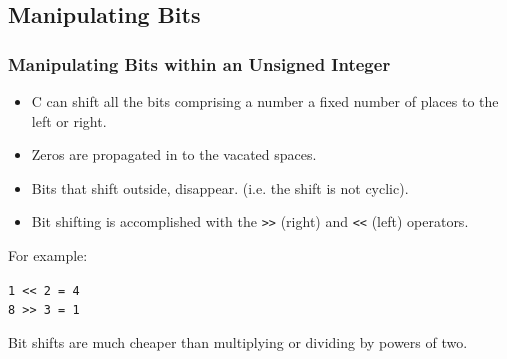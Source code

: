 \documentclass[smaller,handout,table]{beamer}
\begin{document}
\subsection{Manipulating Bits}
\begin{frame}
\frametitle{Manipulating Bits within an Unsigned Integer}
\begin{itemize}
\item C can shift all the bits comprising a number a fixed number of places to the left or right.
\item Zeros are propagated in to the vacated spaces.
\item Bits that shift outside, disappear. (i.e. the shift is not cyclic).
\item Bit shifting is accomplished with the {\tt >>} (right) and {\tt <<} (left) operators.
\end{itemize}
For example:
\begin{center}
\tt 1 << 2 = 4\\
\tt 8 >> 3 = 1
\end{center}
\begin{block}{}
Bit shifts are much cheaper than multiplying or dividing by powers of two.
\end{block}
\end{frame}
\end{document}
